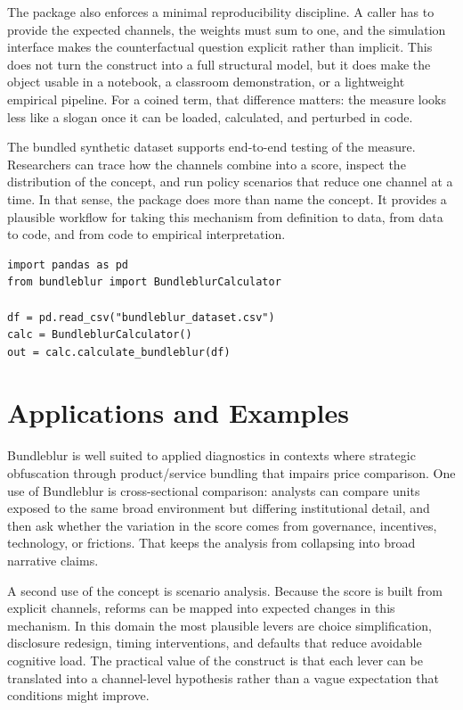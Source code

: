\documentclass[12pt]{article}
\begin{document}
The package also enforces a minimal reproducibility discipline. A caller has to provide the expected channels, the weights must sum to one, and the simulation interface makes the counterfactual question explicit rather than implicit. This does not turn the construct into a full structural model, but it does make the object usable in a notebook, a classroom demonstration, or a lightweight empirical pipeline. For a coined term, that difference matters: the measure looks less like a slogan once it can be loaded, calculated, and perturbed in code.

The bundled synthetic dataset supports end-to-end testing of the measure. Researchers can trace how the channels combine into a score, inspect the distribution of the concept, and run policy scenarios that reduce one channel at a time. In that sense, the package does more than name the concept. It provides a plausible workflow for taking this mechanism from definition to data, from data to code, and from code to empirical interpretation.

\begin{verbatim}
import pandas as pd
from bundleblur import BundleblurCalculator

df = pd.read_csv("bundleblur_dataset.csv")
calc = BundleblurCalculator()
out = calc.calculate_bundleblur(df)
\end{verbatim}

\section{Applications and Examples}
Bundleblur is well suited to applied diagnostics in contexts where strategic obfuscation through product/service bundling that impairs price comparison. One use of Bundleblur is cross-sectional comparison: analysts can compare units exposed to the same broad environment but differing institutional detail, and then ask whether the variation in the score comes from governance, incentives, technology, or frictions. That keeps the analysis from collapsing into broad narrative claims.

A second use of the concept is scenario analysis. Because the score is built from explicit channels, reforms can be mapped into expected changes in this mechanism. In this domain the most plausible levers are choice simplification, disclosure redesign, timing interventions, and defaults that reduce avoidable cognitive load. The practical value of the construct is that each lever can be translated into a channel-level hypothesis rather than a vague expectation that conditions might improve.
\end{document}

